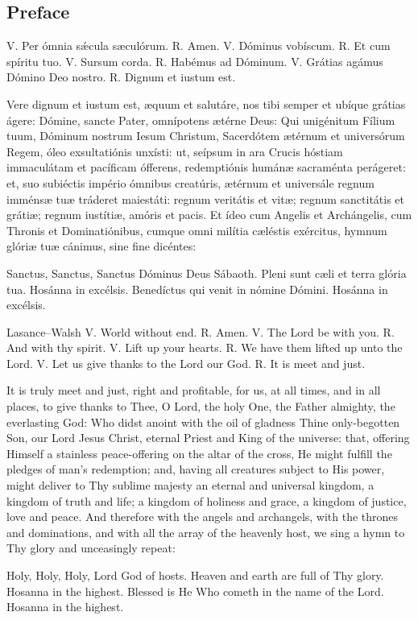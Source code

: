 \subsection{Preface}
\label{proper-preface}
\begin{latinproper}
\textnormal{V.} Per ómnia sǽcula sæculórum. \textnormal{R.} Amen. \textnormal{V.} Dóminus vobíscum. \textnormal{R.} Et cum spíritu tuo. \textnormal{V.} Sursum corda. \textnormal{R.} Habémus ad Dóminum. \textnormal{V.} Grátias agámus Dómino Deo nostro. \textnormal{R.} Dignum et iustum est.

Vere dignum et iustum est, æquum et salutáre, nos tibi semper et ubíque grátias ágere: Dómine, sancte Pater, omnípotens ætérne Deus: Qui unigénitum Fílium tuum, Dóminum nostrum Iesum Christum, Sacerdótem ætérnum et universórum Regem, óleo exsultatiónis unxísti: ut, seípsum in ara Crucis hóstiam immaculátam et pacíficam ófferens, redemptiónis humánæ sacraménta perágeret: et, suo subiéctis império ómnibus creatúris, ætérnum et universále regnum imménsæ tuæ tráderet maiestáti: regnum veritátis et vitæ; regnum sanctitátis et grátiæ; regnum iustítiæ, amóris et pacis. Et ídeo cum Angelis et Archángelis, cum Thronis et Dominatiónibus, cumque omni milítia cæléstis exércitus, hymnum glóriæ tuæ cánimus, sine fine dicéntes:

Sanctus, Sanctus, Sanctus Dóminus Deus Sábaoth. Pleni sunt cæli et terra glória tua. Hosánna in excélsis. Benedíctus qui venit in nómine Dómini. Hosánna in excélsis.
\end{latinproper}
\begin{englishwitness}{Lasance--Walsh}
\textnormal{V.} World without end. \textnormal{R.} Amen. \textnormal{V.} The Lord be with you. \textnormal{R.} And with thy spirit. \textnormal{V.} Lift up your hearts. \textnormal{R.} We have them lifted up unto the Lord. \textnormal{V.} Let us give thanks to the Lord our God. \textnormal{R.} It is meet and just.

It is truly meet and just, right and profitable, for us, at all times, and in all places, to give thanks to Thee, O Lord, the holy One, the Father almighty, the everlasting God: Who didst anoint with the oil of gladness Thine only-begotten Son, our Lord Jesus Christ, eternal Priest and King of the universe: that, offering Himself a stainless peace-offering on the altar of the cross, He might fulfill the pledges of man's redemption; and, having all creatures subject to His power, might deliver to Thy sublime majesty an eternal and universal kingdom, a kingdom of truth and life; a kingdom of holiness and grace, a kingdom of justice, love and peace. And therefore with the angels and archangels, with the thrones and dominations, and with all the array of the heavenly host, we sing a hymn to Thy glory and unceasingly repeat:

Holy, Holy, Holy, Lord God of hosts. Heaven and earth are full of Thy glory. Hosanna in the highest. Blessed is He Who cometh in the name of the Lord. Hosanna in the highest.
\end{englishwitness}
